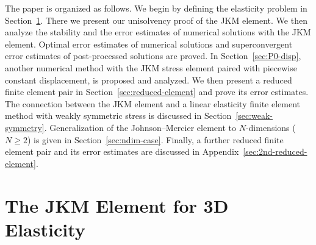 \documentclass[12pt]{amsart}
\numberwithin{equation}{section}
\theoremstyle{definition}
\theoremstyle{remark}
\renewcommand{\(}{\bigl(}
\renewcommand{\)}{\bigr)}
\begin{document}
The paper is organized as follows.  We begin by defining the elasticity problem in Section~\ref{sec:JM-element}. There we present our unisolvency proof of the JKM element. We then analyze the stability and the error estimates of numerical solutions with the JKM element. Optimal error estimates of numerical solutions and superconvergent error estimates of post-processed solutions are proved. In Section~\ref{sec:P0-disp}, another numerical method with the JKM stress element paired with piecewise constant displacement, is proposed and analyzed. We then present  a reduced finite element pair in Section~\ref{sec:reduced-element} and prove its error estimates. The connection between  the JKM element and a linear elasticity finite element method with weakly symmetric stress is discussed in Section~\ref{sec:weak-symmetry}. Generalization of the Johnson--Mercier element to $N$-dimensions ($N\ge 2$) is given in Section~\ref{sec:ndim-case}. Finally, a further reduced finite element pair and its error estimates are discussed in Appendix~\ref{sec:2nd-reduced-element}.







\section{The JKM Element for
  3D Elasticity}
\label{sec:JM-element}
\end{document}
